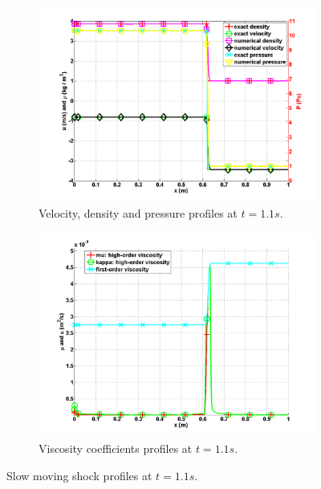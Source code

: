 \documentclass[preprint,10pt]{elsarticle}
\begin{document}
\begin{figure}[H]
        \centering
        \begin{subfigure}[b]{0.495\textwidth}
                \centering
                \includegraphics[width=\textwidth]{SlowMovingShock_density_velocity_pressure_profiles.png}
                \caption{Velocity, density and pressure profiles at $t=1.1s$.}
                \label{fig:profiles_sms}
        \end{subfigure}%
        \begin{subfigure}[b]{0.495\textwidth}
                \centering
                \includegraphics[width=\textwidth]{SlowMovingShock_viscosity.png}
                \caption{Viscosity coefficients profiles at $t=1.1s$.}
                \label{fig:viscosity_sms}
        \end{subfigure} 
        \caption{Slow moving shock profiles at $t=1.1s$.}\label{fig:low_moving_shock}
\end{figure} 
\end{document}
